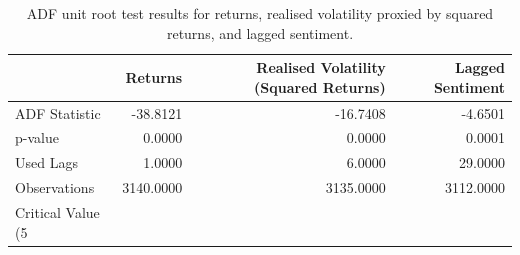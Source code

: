 \begin{table}
\caption{ADF unit root test results for returns, realised volatility proxied by squared returns, and lagged sentiment.}
\label{tab:adf}
\begin{tabular}{lrrr}
\toprule
 & Returns & Realised Volatility (Squared Returns) & Lagged Sentiment \\
\midrule
ADF Statistic & -38.8121 & -16.7408 & -4.6501 \\
p-value & 0.0000 & 0.0000 & 0.0001 \\
Used Lags & 1.0000 & 6.0000 & 29.0000 \\
Observations & 3140.0000 & 3135.0000 & 3112.0000 \\
Critical Value (5%
\bottomrule
\end{tabular}
\end{table}
